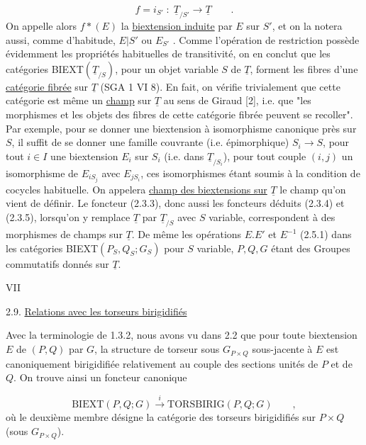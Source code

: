 \begin{equation*}
f = i_{S'} \; : \; \underline{T}_{/S'} \longrightarrow \underline{T} \qquad .
\end{equation*}
On appelle alors $f*(E)$ la \underline{biextension induite} par $E$ sur $S'$, et on la notera aussi, comme d'habitude, $E|S'$ ou $E_{S'}$ . Comme l'opération de restriction possède évidemment les propriétés habituelles de transitivité, on en conclut que les catégories BIEXT$(\underline{T}_{/S})$, pour un objet variable $S$ de $\underline{T}$, forment les fibres d'une \underline{catégorie fibrée} sur $\underline{T}$ (SGA 1 VI 8). En fait, on vérifie trivialement que cette catégorie est même un \underline{champ} sur $\underline{T}$ au sens de Giraud [2], i.e. que "les morphismes et les objets des fibres de cette catégorie fibrée peuvent se recoller". Par exemple, pour se donner une biextension à isomorphisme canonique près sur $S$, il suffit de se donner une famille couvrante (i.e. épimorphique) $S_i \longrightarrow S$, pour tout $i \in I$ une biextension $E_i$ sur $S_i$ (i.e. dans $\underline{T}_{/S_i}$), pour tout couple $(i,j)$ un isomorphisme de $E_{iS_j}$ avec $E_{jS_i}$, ces isomorphismes étant soumis à la condition de cocycles habituelle. On appelera \underline{champ des biextensions sur} $\underline{T}$ le champ qu'on vient de définir. Le foncteur (2.3.3), donc aussi les foncteurs déduits (2.3.4) et (2.3.5), lorsqu'on y remplace $\underline{T}$ par $\underline{T}_{/S}$ avec $S$ variable, correspondent à des morphismes de champs sur $\underline{T}$. De même les opérations $E.E'$ et $E^{-1}$ (2.5.1) dans les catégories BIEXT$(P_S,Q_S;G_S)$ pour $S$ variable, $P,Q,G$ étant des Groupes commutatifs donnés sur $\underline{T}$.




VII


2.9. \underline{Relations avec les torseurs birigidifiés}

Avec la terminologie de 1.3.2, nous avons vu dans 2.2 que pour toute biextension $E$ de $(P,Q)$ par $G$, la structure de torseur sous $G_{P\times Q}$ sous-jacente à $E$ est canoniquement birigidifiée relativement au couple des sections unités de $P$ et de $Q$. On trouve ainsi un foncteur canonique

\begin{equation}\tag{2.9.1}
\mathrm{BIEXT}(P,Q;G) \xrightarrow{\;i\;} \mathrm{TORSBIRIG}(P,Q;G) \qquad ,
\end{equation}
où le deuxième membre désigne la catégorie des torseurs birigidifiés sur $P\times Q$ (sous $G_{P\times Q}$).

